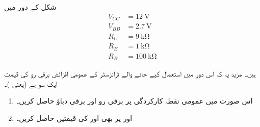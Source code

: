  
شکل  کے دور میں
\begin{align*} 
V_{CC}&=\SI{12}{\volt}\\ 
V_{BB}&=\SI{2.7}{\volt}\\ 
R_C&=\SI{9}{\kilo \ohm}\\ 
R_E&=\SI{1}{\kilo \ohm} \\ 
R_B &=\SI{100}{\kilo \ohm}  
\end{align*}

ہیں۔ مزید یہ کہ اس دور میں استعمال کیے جانے والے ٹرانزسٹر کے عمومی افزائش برقی رو   کی قیمت ایک سو ہے (یعنی )۔

\begin{enumerate}
\item
اس صورت میں عمومی نقطہ کارکردگی پر برقی رو  اور برقی دباؤ   حاصل کریں۔
\item
{} اور  پر بھی  اور  کی قیمتیں حاصل کریں۔
\end{enumerate}

